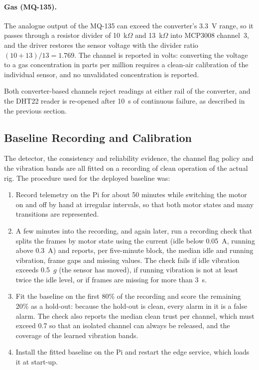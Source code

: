 \paragraph{Gas (MQ-135).} The analogue output of the MQ-135 can exceed the converter's 3.3~V range, so it passes through a resistor divider of 10~k$\Omega$ and 13~k$\Omega$ into MCP3008 channel~3, and the driver restores the sensor voltage with the divider ratio $(10 + 13)/13 = 1.769$. The channel is reported in volts: converting the voltage to a gas concentration in parts per million requires a clean-air calibration of the individual sensor, and no unvalidated concentration is reported.

Both converter-based channels reject readings at either rail of the converter, and the DHT22 reader is re-opened after 10~s of continuous failure, as described in the previous section.

\subsection{Baseline Recording and Calibration}

The detector, the consistency and reliability evidence, the channel flag policy and the vibration bands are all fitted on a recording of clean operation of the actual rig. The procedure used for the deployed baseline was:

\begin{enumerate}
  \item Record telemetry on the Pi for about 50 minutes while switching the motor on and off by hand at irregular intervals, so that both motor states and many transitions are represented.
  \item A few minutes into the recording, and again later, run a recording check that splits the frames by motor state using the current (idle below 0.05~A, running above 0.3~A) and reports, per five-minute block, the median idle and running vibration, frame gaps and missing values. The check fails if idle vibration exceeds 0.5~$g$ (the sensor has moved), if running vibration is not at least twice the idle level, or if frames are missing for more than 3~s.
  \item Fit the baseline on the first 80\% of the recording and score the remaining 20\% as a hold-out: because the hold-out is clean, every alarm in it is a false alarm. The check also reports the median clean trust per channel, which must exceed 0.7 so that an isolated channel can always be released, and the coverage of the learned vibration bands.
  \item Install the fitted baseline on the Pi and restart the edge service, which loads it at start-up.
\end{enumerate}

